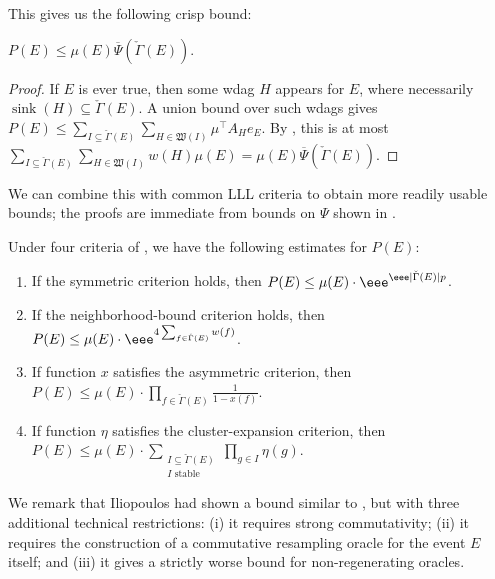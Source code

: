 \documentclass{toc}
\DeclareMathOperator{\sink}{sink}
\begin{document}
This gives us the following crisp bound:
 
\begin{theorem}
\label{crispdist}
$P(E) \leq \mu(E) \overline{\Psi}(\check \Gamma(E))$.
\end{theorem}
\begin{proof}
If $E$ is ever true, then some wdag $H$ appears for $E$, where necessarily $\sink(H) \subseteq \check \Gamma(E)$. A union bound over such wdags gives $P(E) \leq \sum_{I \subseteq \check \Gamma(E)} \sum_{H \in \mathfrak W(I)} \mu^{\top} A_H e_E$. By , this is at most $\sum_{I \subseteq \check \Gamma(E)} \sum_{H \in \mathfrak W(I)} w(H) \mu(E) = \mu(E) \overline{\Psi} (\check \Gamma(E))$.
\end{proof}

We can combine this with common LLL criteria to obtain more readily usable bounds; the proofs are immediate from bounds on $\Psi$ shown in .
\begin{proposition}
\label{main-bound-sum2}
Under four criteria of , we have the following estimates for $P(E)$:
\begin{enumerate}
\item If the symmetric criterion holds,  then  $P(E) \leq \mu(E) \cdot \eee^{\eee |\check \Gamma(E)|  p}$.

\item If the neighborhood-bound criterion holds, then $P(E) \leq \mu(E) \cdot \eee^{4 \sum_{f \in \check \Gamma(E)} w(f)}$.

\item If function $x$ satisfies the asymmetric criterion, then $P(E) \leq \mu(E) \cdot \prod_{f \in \check \Gamma(E)} \frac{1}{1 - x(f)}$.

\item If function $\eta$ satisfies the cluster-expansion criterion,  then $P(E) \leq \mu(E) \cdot \sum_{\substack{ I \subseteq \check \Gamma(E) \\ \text{$I$ stable}}}  \prod_{g \in I} \eta(g)$.
\end{enumerate}
\end{proposition}

We remark that Iliopoulos \cite{LLLWTL} had shown a bound similar to , but with three additional technical restrictions: (i) it requires strong commutativity; (ii) it requires the construction of a commutative resampling oracle for the event $E$ itself; and (iii)  it gives a strictly worse bound for non-regenerating oracles.
\end{document}
